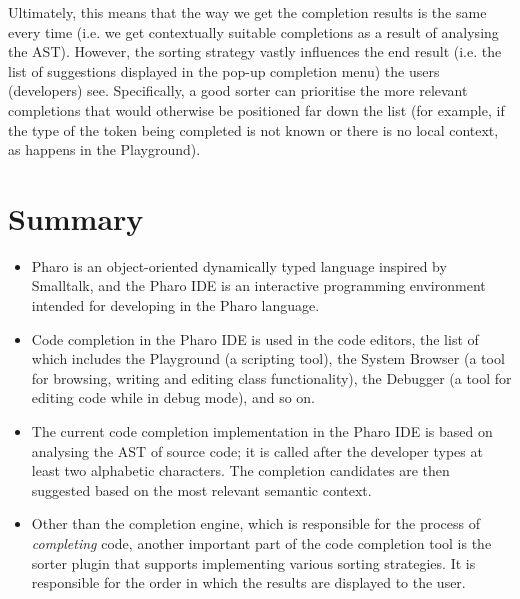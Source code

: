 Ultimately, this means that the way we get the completion results is the same every time (i.e. we get contextually suitable completions as a result of analysing the AST). However, the sorting strategy vastly influences the end result (i.e. the list of suggestions displayed in the pop-up completion menu) the users (developers) see. Specifically, a good sorter can prioritise the more relevant completions that would otherwise be positioned far down the list (for example, if the type of the token being completed is not known or there is no local context, as happens in the Playground).

\section{Summary}
\label{sec:PharoCompletion-Summary}
\begin{itemize}
    \item Pharo is an object-oriented dynamically typed language inspired by Smalltalk, and the Pharo IDE is an interactive programming environment intended for developing in the Pharo language.
    \item Code completion in the Pharo IDE is used in the code editors, the list of which includes the Playground (a scripting tool), the System Browser (a tool for browsing, writing and editing class functionality), the Debugger (a tool for editing code while in debug mode), and so on.
    \item The current code completion implementation in the Pharo IDE is based on analysing the AST of source code; it is called after the developer types at least two alphabetic characters. The completion candidates are then suggested based on the most relevant semantic context.
    \item Other than the completion engine, which is responsible for the process of \textit{completing} code, another important part of the code completion tool is the sorter plugin that supports implementing various sorting strategies. It is responsible for the order in which the results are displayed to the user.
\end{itemize}